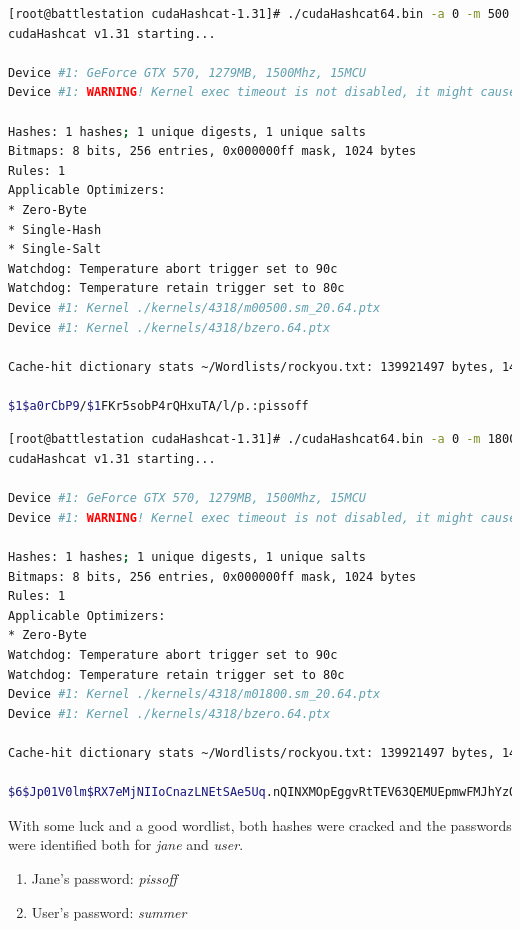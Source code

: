 \begin{lstlisting}[language=bash,caption={Cracking Jane}]
[root@battlestation cudaHashcat-1.31]# ./cudaHashcat64.bin -a 0 -m 500 ~/jane.wtf ~/Wordlists/rockyou.txt 
cudaHashcat v1.31 starting...

Device #1: GeForce GTX 570, 1279MB, 1500Mhz, 15MCU
Device #1: WARNING! Kernel exec timeout is not disabled, it might cause you errors of code 702

Hashes: 1 hashes; 1 unique digests, 1 unique salts
Bitmaps: 8 bits, 256 entries, 0x000000ff mask, 1024 bytes
Rules: 1
Applicable Optimizers:
* Zero-Byte
* Single-Hash
* Single-Salt
Watchdog: Temperature abort trigger set to 90c
Watchdog: Temperature retain trigger set to 80c
Device #1: Kernel ./kernels/4318/m00500.sm_20.64.ptx
Device #1: Kernel ./kernels/4318/bzero.64.ptx

Cache-hit dictionary stats ~/Wordlists/rockyou.txt: 139921497 bytes, 14343296 words, 14343296 keyspace

$1$a0rCbP9/$1FKr5sobP4rQHxuTA/l/p.:pissoff
\end{lstlisting}


\begin{lstlisting}[language=bash,caption={Cracking User}]
[root@battlestation cudaHashcat-1.31]# ./cudaHashcat64.bin -a 0 -m 1800 ~/user.wtf ~/Wordlists/rockyou.txt 
cudaHashcat v1.31 starting...

Device #1: GeForce GTX 570, 1279MB, 1500Mhz, 15MCU
Device #1: WARNING! Kernel exec timeout is not disabled, it might cause you errors of code 702

Hashes: 1 hashes; 1 unique digests, 1 unique salts
Bitmaps: 8 bits, 256 entries, 0x000000ff mask, 1024 bytes
Rules: 1
Applicable Optimizers:
* Zero-Byte
Watchdog: Temperature abort trigger set to 90c
Watchdog: Temperature retain trigger set to 80c
Device #1: Kernel ./kernels/4318/m01800.sm_20.64.ptx
Device #1: Kernel ./kernels/4318/bzero.64.ptx

Cache-hit dictionary stats ~/Wordlists/rockyou.txt: 139921497 bytes, 14343296 words, 14343296 keyspace

$6$Jp01V0lm$RX7eMjNIIoCnazLNEtSAe5Uq.nQINXMOpEggvRtTEV63QEMUEpmwFMJhYzQtLT/M33Kbl5Mhr59tPJbvN/u4k1:summer
\end{lstlisting}

With some luck and a good wordlist, both hashes were cracked and the passwords were identified both for \textit{jane} and \textit{user}.

\begin{enumerate}
	\item Jane's password: \textit{pissoff}
	\item User's password: \textit{summer}
\end{enumerate}


